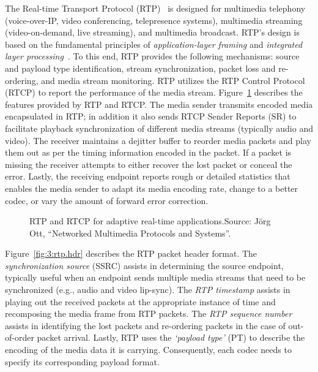 
The Real-time Transport Protocol (RTP)~\cite{rfc3550} is designed for
multimedia telephony (voice-over-IP, video conferencing, telepresence
systems), multimedia streaming (video-on-demand, live streaming), and
multimedia broadcast. RTP's design is based on the fundamental principles of
\textit {application-layer framing} and \textit{integrated layer
processing}~\cite{clark:alf}. To this end, RTP provides the following
mechanisms: source and payload type identification, stream synchronization,
packet loss and re-ordering, and media stream monitoring. RTP utilizes the RTP
Control Protocol (RTCP) to report the performance of the media stream.
Figure~\ref{fig:3:rtp:model} describes the features provided by RTP and RTCP.
The media sender transmits encoded media encapsulated in RTP; in addition it
also sends RTCP Sender Reports (SR) to facilitate playback synchronization of
different media streams (typically audio and video). The receiver maintains a
dejitter buffer to reorder media packets and play them out as per the timing
information encoded in the packet. If a packet is missing the receiver attempts
to either recover the lost packet or conceal the error. Lastly, the receiving
endpoint reports rough or detailed statistics that enables the media sender to
adapt its media encoding rate, change to a better codec, or vary the amount of
forward error correction.

\begin{figure}[!h]
\caption{RTP and RTCP for adaptive real-time applications.{\scriptsize Source:
J\"org Ott, ``Networked Multimedia Protocols and Systems''}.}
\label{fig:3:rtp:model}
\end{figure}

Figure~\ref{fig:3:rtp.hdr} describes the RTP packet header format. The
\textit{synchronization source} (SSRC) assists in determining the source
endpoint, typically useful when an endpoint sends multiple media streams that
need to be synchronized (e.g., audio and video lip-sync). The \textit{RTP
timestamp} assists in playing out the received packets at the appropriate
instance of time and recomposing the media frame from RTP packets. The
\textit{RTP sequence number} assists in identifying the lost packets and 
re-ordering packets in the case of out-of-order packet arrival. Lastly, RTP uses
the \textit{`payload type'} (PT) to describe the encoding of the media data it is
carrying. Consequently, each codec needs to specify its corresponding payload
format.

